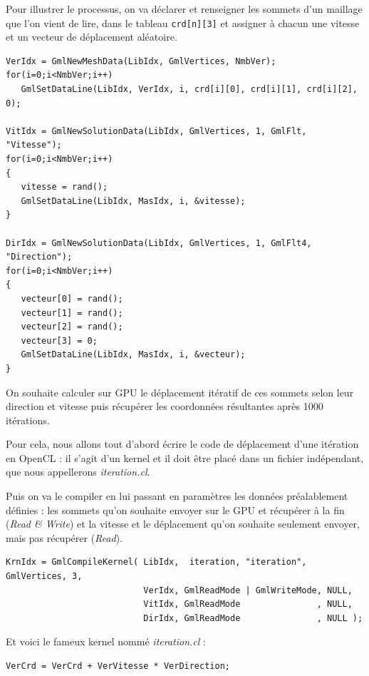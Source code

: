 \documentclass[a4paper,12pt]{article}
\begin{document}
Pour illustrer le processus, on va déclarer et renseigner les sommets d'un maillage que l'on vient de lire, dans le tableau {\tt crd[n][3]} et assigner à chacun une vitesse et un vecteur de déplacement aléatoire.

\begin{tt}
\begin{verbatim}
VerIdx = GmlNewMeshData(LibIdx, GmlVertices, NmbVer);
for(i=0;i<NmbVer;i++)
   GmlSetDataLine(LibIdx, VerIdx, i, crd[i][0], crd[i][1], crd[i][2], 0);

VitIdx = GmlNewSolutionData(LibIdx, GmlVertices, 1, GmlFlt, "Vitesse");
for(i=0;i<NmbVer;i++)
{
   vitesse = rand();
   GmlSetDataLine(LibIdx, MasIdx, i, &vitesse);
}

DirIdx = GmlNewSolutionData(LibIdx, GmlVertices, 1, GmlFlt4, "Direction");
for(i=0;i<NmbVer;i++)
{
   vecteur[0] = rand();
   vecteur[1] = rand();
   vecteur[2] = rand();
   vecteur[3] = 0;
   GmlSetDataLine(LibIdx, MasIdx, i, &vecteur);
}
\end{verbatim}
\end{tt}
\normalfont

On souhaite calculer sur GPU le déplacement itératif de ces sommets selon leur direction et vitesse puis récupérer les coordonnées résultantes après 1000 itérations.

Pour cela, nous allons tout d'abord écrire le code de déplacement d'une itération en OpenCL : il s'agit d'un kernel et il doit être placé dans un fichier indépendant, que nous appellerons \emph{iteration.cl}.

Puis on va le compiler en lui passant en paramètres les données préalablement définies : les sommets qu'on souhaite envoyer sur le GPU et récupérer à la fin (\emph{Read \& Write}) et la vitesse et le déplacement qu'on souhaite seulement envoyer, mais pas récupérer (\emph{Read}).

\begin{tt}
\begin{verbatim}
KrnIdx = GmlCompileKernel( LibIdx,  iteration, "iteration", GmlVertices, 3,
                           VerIdx, GmlReadMode | GmlWriteMode, NULL,
                           VitIdx, GmlReadMode               , NULL,
                           DirIdx, GmlReadMode               , NULL );
\end{verbatim}
\end{tt}
\normalfont

Et voici le fameux kernel nommé \emph{iteration.cl} : 

\begin{tt}
\begin{verbatim}
VerCrd = VerCrd + VerVitesse * VerDirection;
\end{verbatim}
\end{tt}
\normalfont
\end{document}
